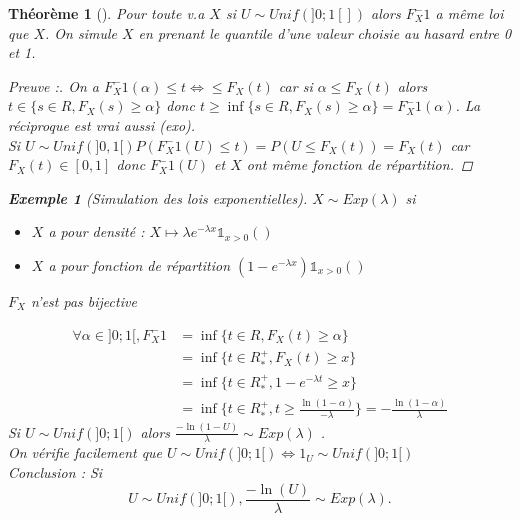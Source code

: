 \documentclass{article}
\theoremstyle{plain}%
\newtheorem{thm}{Théorème}[section]
\theoremstyle{definition}
\newtheorem{exmp}{Exemple}[section]
\theoremstyle{remark}
\begin{document}
    \begin{thm}[]
        Pour toute v.a $ X $ si $ U \sim Unif(]0;1[]) $ alors $ F_X^-1 $ a même loi que $ X $. On simule $ X $ en prenant le quantile d'une valeur choisie au hasard entre 0 et 1. 
        \begin{proof}[Preuve :]
            On a $ F_X^-1(\alpha ) \leq t \Leftrightarrow \leq F_X(t) $ car si $ \alpha \leq F_X(t) $ alors $ t \in \{s \in R, F_X(s) \geq \alpha \} $ donc $ t \geq \inf \{s \in R, F_X(s) \geq \alpha\} = F_X^-1(\alpha )$. La réciproque est vrai aussi (exo). \\ 
            Si $ U \sim Unif(]0,1[) P(F_X^-1(U) \leq t) = P(U \leq F_X (t)) = F_X(t) $ car $ F_X(t) \in [0,1] $ donc $ F_X^-1(U)$ et $X$ ont même fonction de répartition.
        \end{proof}
        
        \begin{exmp}[Simulation des lois exponentielles]
            $ X \sim Exp(\lambda ) $ si \begin{itemize}
                \item $ X $ a pour densité : $ X \mapsto \lambda e^{-\lambda x}\mathbb{1}_{x>0}() $ 
                \item $ X $ a pour fonction de répartition $ (1-e^{- \lambda x}) \mathbb{1}_{x>0}()$ 
            \end{itemize}
            $ F_X $ n'est pas bijective 
            
            \begin{align*}
                \forall \alpha \in ]0;1[, F_X^-1 &= \inf \{t \in R, F_X(t) \geq \alpha \} \\
                        & = \inf \{t \in R^+_*, F_X(t) \geq x\} \\
                        & = \inf \{t \in R^+_*, 1-e^{-\lambda t} \geq x\} \\
                        & = \inf \{t \in R^+_*, t \geq \frac{\ln (1-\alpha  )}{-\lambda } \}  = -\frac{\ln (1-\alpha )}{\lambda }
            \end{align*}
            Si $ U \sim Unif(]0;1[) $ alors $ \frac{-\ln (1-U)}{\lambda } \sim Exp(\lambda ) $ . \\ 
            On vérifie facilement que $ U \sim Unif(]0;1[) \Leftrightarrow 1_U \sim Unif(]0;1[) $ \\ 
            Conclusion : Si 
            \[
                U \sim Unif(]0;1[),  \frac{-\ln (U)}{\lambda } \sim Exp(\lambda )
            .\]
        \end{exmp}


\end{thm}
\end{document}
